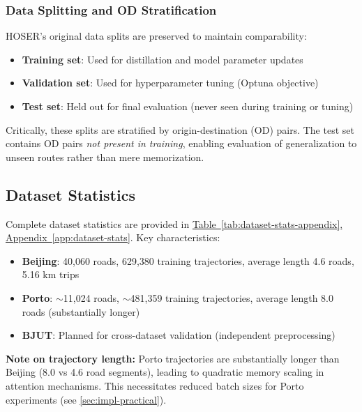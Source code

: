 \subsubsection{Data Splitting and OD Stratification}

HOSER's original data splits are preserved to maintain comparability:

\begin{itemize}[noitemsep,topsep=0pt]
    \item \textbf{Training set}: Used for distillation and model parameter updates
    \item \textbf{Validation set}: Used for hyperparameter tuning (Optuna objective)
    \item \textbf{Test set}: Held out for final evaluation (never seen during training or tuning)
\end{itemize}

Critically, these splits are stratified by origin-destination (OD) pairs. The test set contains OD pairs \emph{not present in training}, enabling evaluation of generalization to unseen routes rather than mere memorization.

\subsection{Dataset Statistics}
\label{sec:data-stats}

Complete dataset statistics are provided in \hyperref[app:dataset-stats]{Table~\ref*{tab:dataset-stats-appendix}, Appendix~\ref*{app:dataset-stats}}. Key characteristics:

\begin{itemize}[noitemsep,topsep=0pt]
    \item \textbf{Beijing}: 40,060 roads, 629,380 training trajectories, average length 4.6 roads, 5.16 km trips
    \item \textbf{Porto}: $\sim$11,024 roads, $\sim$481,359 training trajectories, average length 8.0 roads (substantially longer)
    \item \textbf{BJUT}: Planned for cross-dataset validation (independent preprocessing)
\end{itemize}

\textbf{Note on trajectory length:} Porto trajectories are substantially longer than Beijing (8.0 vs 4.6 road segments), leading to quadratic memory scaling in attention mechanisms. This necessitates reduced batch sizes for Porto experiments (see \autoref{sec:impl-practical}).

